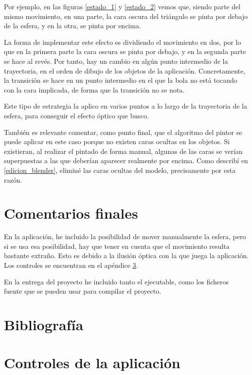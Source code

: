 \documentclass[a4paper,12pt]{article}
\begin{document}
Por ejemplo, en las figuras \ref{estado_1} y \ref{estado_2} vemos que, siendo parte del mismo movimiento, en una parte, la cara oscura del triángulo se pinta por debajo de la esfera, y en la otra, se pinta por encima.

La forma de implementar este efecto es dividiendo el movimiento en dos, por lo que en la primera parte la cara oscura se pinta por debajo, y en la segunda parte se hace al revés. Por tanto, hay un cambio en algún punto intermedio de la trayectoria, en el orden de dibujo de los objetos de la aplicación. Concretamente, la transición se hace en un punto intermedio en el que la bola no está tocando con la cara implicada, de forma que la transición no se nota.

Este tipo de estrategia la aplico en varios puntos a lo largo de la trayectoria de la esfera, para conseguir el efecto óptico que busco.

También es relevante comentar, como punto final, que el algoritmo del pintor se puede aplicar en este caso porque no existen caras ocultas en los objetos. Si existieran, al realizar el pintado de forma manual, algunas de las caras se verían superpuestas a las que deberían aparecer realmente por encima. Como describí en \ref{edicion_blender}, eliminé las caras ocultas del modelo, precisamente por esta razón.

\section{Comentarios finales}

En la aplicación, he incluido la posibilidad de mover manualmente la esfera, pero si se usa esa posibilidad, hay que tener en cuenta que el movimiento resulta bastante extraño. Esto es debido a la ilusión óptica con la que juega la aplicación. Los controles se encuentran en el apéndice \ref{controles}.

En la entrega del proyecto he incluido tanto el ejecutable, como los ficheros fuente que se pueden usar para compilar el proyecto.

\newpage
\section{Bibliografía}


\newpage
\appendix
\section{Controles de la aplicación} \label{controles}
\end{document}
